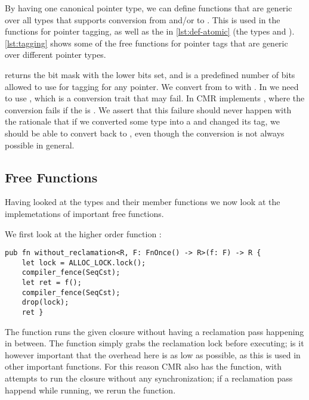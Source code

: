 By having one canonical pointer type, we can define functions that are generic over all types
that supports conversion from and/or to . This is used in the functions for
pointer tagging, as well as the  in \cref{lst:def-atomic} (the types  and
). \cref{lst:tagging} shows some of the free functions for pointer tags that are generic
over different pointer types.

\begin{figure}[ht]

\end{figure}

 returns the bit mask with the  lower bits set, and  is a
predefined number of bits allowed to use for tagging for any pointer. We convert from  to
 with  .  In   we need
to use , which is a conversion trait that may fail. In CMR  implements
, where the conversion fails if the  is . We
assert that this failure should never happen  with the rationale that if we converted
some type  into a  and changed its tag, we should be able to convert back
to , even though the conversion is not always possible in general.

\subsection{Free Functions}

Having looked at the types and their member functions we now look at the implemetations of
important free functions.

We first look at the higher order function :
\begin{lstlisting}[style=Rust]
pub fn without_reclamation<R, F: FnOnce() -> R>(f: F) -> R {
    let lock = ALLOC_LOCK.lock();
    compiler_fence(SeqCst);
    let ret = f();
    compiler_fence(SeqCst);
    drop(lock);
    ret }
\end{lstlisting}
The function runs the given closure without having a reclamation pass happening in between.  The
function simply grabs the reclamation lock before executing; is it however important that the
overhead here is as low as possible, as this is used in other important functions. For this reason
CMR also has the  function, with attempts to run the closure
without any synchronization; if a reclamation pass happend while running, we rerun the function.

